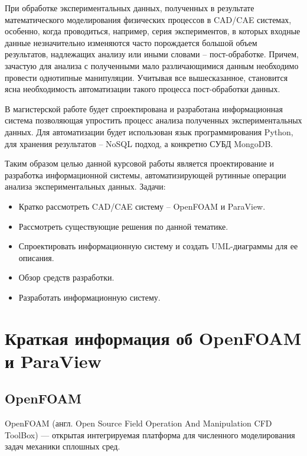 \documentclass[14pt]{extreport}
\begin{document}



\tableofcontents

\intro

При обработке экспериментальных данных, полученных в результате математического моделирования физических процессов в CAD/CAE системах, особенно, когда проводиться, например, серия экспериментов, в которых входные данные незначительно изменяются часто порождается большой объем результатов, надлежащих анализу или иными словами -- пост-обработке. Причем, зачастую для анализа с полученными мало различающимися данным необходимо провести однотипные манипуляции. Учитывая все вышесказанное, становится ясна необходимость автоматизации такого процесса пост-обработки данных. 

В магистерской работе будет спроектирована и разработана информационная система позволяющая упростить процесс анализа полученных экспериментальных данных. Для автоматизации будет использован язык программирования Python, для хранения результатов -- NoSQL подход, а конкретно СУБД MongoDB. 

Таким образом целью данной курсовой работы является проектирование и разработка информационной системы, автоматизирующей рутинные операции анализа экспериментальных данных.
Задачи:
\begin{itemize}
\item Кратко рассмотреть CAD/CAE систему -- OpenFOAM и ParaView.
\item Рассмотреть существующие решения по данной тематике.
\item Спроектировать информационную систему и создать UML-диаграммы для ее описания.
\item Обзор средств разработки.
\item Разработать информационную систему.
\end{itemize}

\chapter{Краткая информация об OpenFOAM и ParaView}
\section{OpenFOAM}
OpenFOAM (англ. Open Source Field Operation And Manipulation CFD ToolBox) — открытая интегрируемая платформа для численного моделирования задач механики сплошных сред. ~\cite{OpenfoamWiki}
\end{document}
